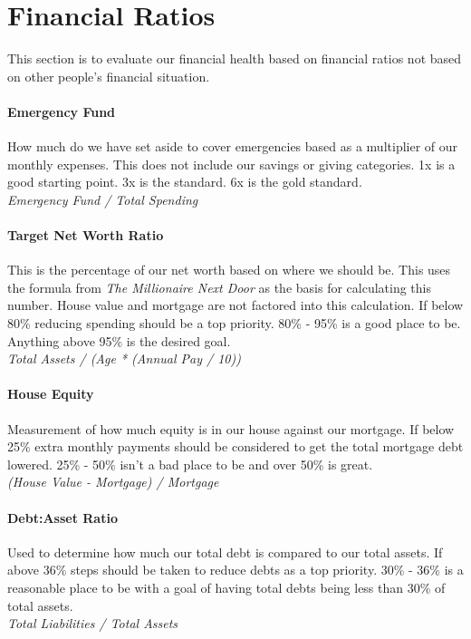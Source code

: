\section*{Financial Ratios}
This section is to evaluate our financial health based on financial ratios not based on other people's financial situation.

\paragraph{Emergency Fund} How much do we have set aside to cover emergencies based as a multiplier of our monthly expenses. This does not include our savings or giving categories. 1x is a good starting point. 3x is the standard. 6x is the gold standard. \\
\textit{Emergency Fund / Total Spending}

\paragraph{Target Net Worth Ratio} This is the percentage of our net worth based on where we should be. This uses the formula from \textit{The Millionaire Next Door} as the basis for calculating this number. House value and mortgage are not factored into this calculation. If below 80\% reducing spending should be a top priority. 80\% - 95\% is a good place to be. Anything above 95\% is the desired goal. \\
\textit{Total Assets / (Age * (Annual Pay / 10))}

\paragraph{House Equity} Measurement of how much equity is in our house against our mortgage. If below 25\% extra monthly payments should be considered to get the total mortgage debt lowered. 25\% - 50\% isn't a bad place to be and over 50\% is great. \\
\textit{(House Value - Mortgage) / Mortgage}

\paragraph{Debt:Asset Ratio} Used to determine how much our total debt is compared to our total assets. If above 36\% steps should be taken to reduce debts as a top priority. 30\% - 36\% is a reasonable place to be with a goal of having total debts being less than 30\% of total assets. \\
\textit{Total Liabilities / Total Assets}


